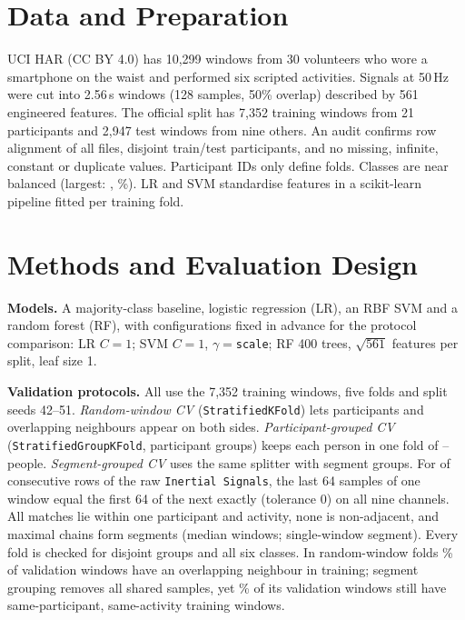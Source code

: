 \documentclass{article}
\begin{document}
\section{Data and Preparation}
UCI HAR \citep{anguita2013,uci_har} (CC BY 4.0) has 10,299 windows from 30 volunteers who wore a smartphone on the waist and performed six scripted activities. Signals at 50\,Hz were cut into 2.56\,s windows (128 samples, 50\% overlap) described by 561 engineered features. The official split has 7,352 training windows from 21 participants and 2,947 test windows from nine others. An audit confirms row alignment of all files, disjoint train/test participants, and no missing, infinite, constant or duplicate values. Participant IDs only define folds. Classes are near balanced (largest: \Nmajlabel, \Nmajshare\%). LR and SVM standardise features in a scikit-learn pipeline \citep{sklearn} fitted per training fold.

\section{Methods and Evaluation Design}
\textbf{Models.} A majority-class baseline, logistic regression (LR), an RBF SVM and a random forest (RF), with configurations fixed in advance for the protocol comparison: LR $C{=}1$; SVM $C{=}1$, $\gamma{=}$\texttt{scale}; RF 400 trees, $\sqrt{561}$ features per split, leaf size 1.

\textbf{Validation protocols.} All use the 7,352 training windows, five folds and split seeds 42--51. \emph{Random-window CV} (\texttt{StratifiedKFold}) lets participants and overlapping neighbours appear on both sides. \emph{Participant-grouped CV} (\texttt{StratifiedGroupKFold}, participant groups) keeps each person in one fold of \Ngrpvalsubjmin--\Ngrpvalsubjmax{} people. \emph{Segment-grouped CV} uses the same splitter with segment groups. For \Nnlinks{} of \Nnpairs{} consecutive rows of the raw \texttt{Inertial Signals}, the last 64 samples of one window equal the first 64 of the next exactly (tolerance 0) on all nine channels. All matches lie within one participant and activity, none is non-adjacent, and maximal chains form \Nnseg{} segments (median \Nseglenmed{} windows; \Nnsingleseg{} single-window segment). Every fold is checked for disjoint groups and all six classes. In random-window folds \NoverlapR\% of validation windows have an overlapping neighbour in training; segment grouping removes all shared samples, yet \NsaS\% of its validation windows still have same-participant, same-activity training windows.
\end{document}
